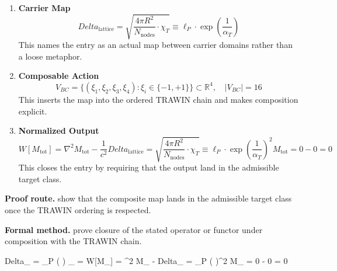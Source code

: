 
\begin{enumerate}[leftmargin=1.6em,itemsep=9pt,topsep=6pt]
\item \textbf{Carrier Map}
\[
Delta_{\text{lattice}} = \sqrt{\frac{4\pi R^2}{N_{\text{nodes}}} \cdot \chi_T} \equiv \ell_P \cdot \exp\left( \frac{1}{\alpha_T} \right)
\]
This names the entry as an actual map between carrier domains rather than a loose metaphor.

\item \textbf{Composable Action}
\[
V_{BC} = \{ (\xi_1, \xi_2, \xi_3, \xi_4) : \xi_i \in \{ -1, +1 \} \} \subset \mathbb{R}^4, \quad |V_{BC}| = 16
\]
This inserts the map into the ordered TRAWIN chain and makes composition explicit.

\item \textbf{Normalized Output}
\[
W[M_{\text{tot}}] = \nabla^2 M_{\text{tot}} - \frac{1}{c^2}Delta_{\text{lattice}} = \sqrt{\frac{4\pi R^2}{N_{\text{nodes}}} \cdot \chi_T} \equiv \ell_P \cdot \exp\left( \frac{1}{\alpha_T} \right)^2 M_{\text{tot}} = 0 - 0 = 0
\]
This closes the entry by requiring that the output land in the admissible target class.
\end{enumerate}

\textbf{Proof route.} show that the composite map lands in the admissible target class once the TRAWIN ordering is respected.

\textbf{Formal method.} prove closure of the stated operator or functor under composition with the TRAWIN chain.

\medskip
{}

\begin{tzpsnapshot}
\end{tzpsnapshot}

\tzpequationlinks
  {Delta_{} =  \equiv \ell_P \cdot \exp\left(  \right)}
  {_{} = \cdots}
  {W[M_{}] = \nabla^2 M_{} - Delta_{} =  \equiv \ell_P \cdot \exp\left(  \right)^2 M_{} = 0 - 0 = 0}
